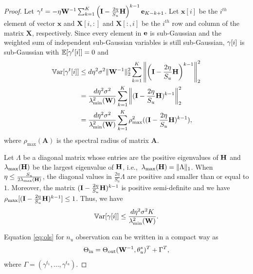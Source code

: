 \begin{proof}
  Let $\mathbf{\gamma}^t = -\eta\mathbf{W}^{-1} \sum_{k=1}^{K}\left(\mathbf{I} -  \frac{2\eta}{S_u}\mathbf{H}\right)^{k-1}\mathbf{e}_{K-k+1}$.  
 Let $\mathbf{x}[i]$ be the $i^{th}$ element of vector $\mathbf{x}$ and $\mathbf{X}[i,:]$ and $\mathbf{X}[:,i]$ be the $i^{th}$ row and column of the matrix $\mathbf{X}$, respectively.
Since every element in $\mathbf{e}$ is sub-Gaussian and the weighted sum of independent sub-Gaussian variables is still sub-Gaussian, $\mathbf{\gamma}[i]$ is sub-Gaussian with $\mathbb{E}[\mathbf{\gamma}^t[i]] = 0$ and 
\begin{align*}
\mathbb{V}\mathrm{ar}[\mathbf{\gamma}^t[i]]& \leq d\eta^2\sigma^2 \lVert \mathbf{W}^{-1} \rVert_2^2  \sum_{k=1}^{K}\left\lVert \left(\mathbf{I} -  \frac{2\eta}{S_u}\mathbf{H}\right)^{k-1}\right\rVert^2_2\\
    &= 
    \frac{d\eta^2\sigma^2}{\lambda^2_{\text{min}}(\mathbf{W})} \sum_{k=1}^{K}\left\lVert (\mathbf{I} -  \frac{2\eta}{S_u}\mathbf{H})^{k-1}\right\rVert^2_2\\
    &=  \frac{d\eta^2\sigma^2}{\lambda^2_{\text{min}}(\mathbf{W})} \sum_{k=1}^{K} \rho_{\max}^2( (\mathbf{I} -  \frac{2\eta}{S_u}\mathbf{H})^{k-1}),\\
\end{align*}
where $\rho_{\max}(\mathbf{A})$ is the spectral radius of matrix $\mathbf{A}$.

Let $\Lambda$ be a diagonal matrix whose entries are the positive eigenvalues of $\mathbf{H}$ and $\lambda_{\max}(\mathbf{H})$ be the largest eigenvalue of $\mathbf{H}$, i.e.,~$\lambda_{\max}(\mathbf{H}) = \lVert\Lambda \rVert_1$. When $\eta \leq \frac{S_u}{2\lambda_{\max}(\mathbf{H})}$, the diagonal values in $\frac{2\eta}{S_u}\Lambda$ are positive and smaller than or equal to $1$. 
Moreover, the matrix  $(\mathbf{I} -  \frac{2\eta}{S_u}\mathbf{H})^{k-1}$ is positive semi-definite and we have $\rho_{\max}[(\mathbf{I} -  \frac{2\eta}{S_u}\mathbf{H})^{k-1}] \leq 1$. Thus, we have
\begin{equation}\label{eq:bound_var_noise}
    \mathbb{V}\mathrm{ar}[\mathbf{\gamma}[i]] \leq \frac{d\eta^2\sigma^2 K}{\lambda^2_{\text{min}}(\mathbf{W})}. 
\end{equation}

Equation \eqref{eq:ols} for $n_u$ observation can be written in a compact way as
\begin{equation}
\label{eq:ols_matrix}
\Theta_{\text{in}} = \Theta_{\text{out}}(\mathbf{W}^{-1}, \theta^*_u)^T + \Gamma^T,
\end{equation}
where $\Gamma = (\gamma^{t_1}, \dots, \gamma^{t_u})$.


\end{proof}

